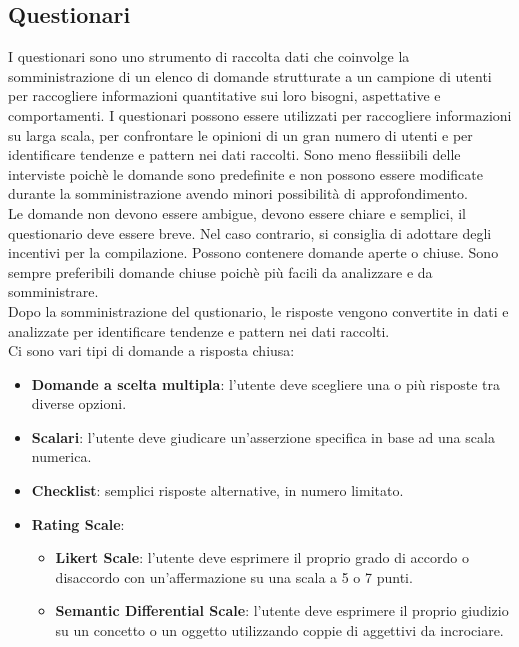 \documentclass{report}
\begin{document}
	\subsection{Questionari}
	I questionari sono uno strumento di raccolta dati che coinvolge la somministrazione di un elenco di domande strutturate a un campione di utenti per raccogliere informazioni quantitative sui loro bisogni, aspettative e comportamenti. I questionari possono essere utilizzati per raccogliere informazioni su larga scala, per confrontare le opinioni di un gran numero di utenti e per identificare tendenze e pattern nei dati raccolti. Sono meno flessiibili delle interviste poichè le domande sono predefinite e non possono essere modificate durante la somministrazione avendo minori possibilità di approfondimento. 
	\vspace{\baselineskip}\\
	Le domande non devono essere ambigue, devono essere chiare e semplici, il questionario deve essere breve. Nel caso contrario, si consiglia di adottare degli incentivi per la compilazione. Possono contenere domande aperte o chiuse. Sono sempre preferibili domande chiuse poichè più facili da analizzare e da somministrare.
	\vspace{\baselineskip}\\
	Dopo la somministrazione del qustionario, le risposte vengono convertite in dati e analizzate per identificare tendenze e pattern nei dati raccolti.
	\vspace{\baselineskip}\\
	Ci sono vari tipi di domande a risposta chiusa:
	\begin{itemize}
		\item \textbf{Domande a scelta multipla}: l'utente deve scegliere una o più risposte tra diverse opzioni.
		\item \textbf{Scalari}: l'utente deve giudicare un'asserzione specifica in base ad una scala numerica.
		\item \textbf{Checklist}: semplici risposte alternative, in numero limitato.
		\item \textbf{Rating Scale}: 
		\begin{itemize}
			\item \textbf{Likert Scale}: l'utente deve esprimere il proprio grado di accordo o disaccordo con un'affermazione su una scala a 5 o 7 punti.
			\item \textbf{Semantic Differential Scale}: l'utente deve esprimere il proprio giudizio su un concetto o un oggetto utilizzando coppie di aggettivi da incrociare.
		\end{itemize}
	\end{itemize}
	
\end{document}
